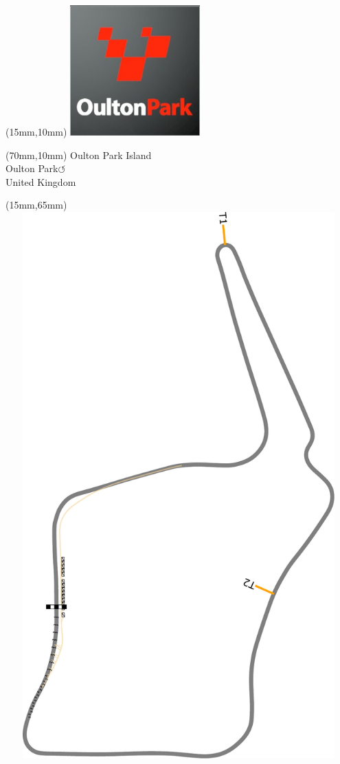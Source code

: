 \null\newpage
\begin{textblock*}{50mm}(15mm,10mm)%
\includegraphics[width=50mm]{LG/2015-05-20_00091.png}
\end{textblock*}
\begin{textblock*}{130mm}(70mm,10mm)%
{\fontsize{20}{20}\selectfont Oulton Park Island\\}
{\fontsize{16}{16}\selectfont Oulton Park\hfill \huge$\circlearrowleft$\\}
{\fontsize{12}{12}\selectfont United Kingdom\\}
\end{textblock*}
\begin{textblock*}{185mm}(15mm,65mm)%
\centering
\mbox{\includegraphics[width=185mm,height=210mm,keepaspectratio]{PT/OUPAIS.pdf}}
\end{textblock*}
